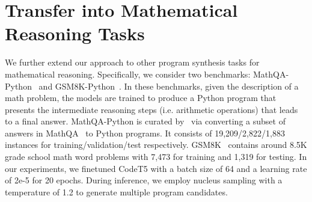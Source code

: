 \documentclass{article}
\begin{document}
\section{Transfer into Mathematical Reasoning Tasks}
We further extend our approach to other program synthesis tasks  for mathematical reasoning. Specifically, we consider two benchmarks: MathQA-Python~\citep{austin2021program} and GSM8K-Python~\citep{palm}. In these benchmarks, given the description of a math problem, the models are trained to produce a Python program that presents the intermediate reasoning steps (i.e. arithmetic operations) that leads to a final answer. MathQA-Python is curated by~\citet{austin2021program} via converting a subset of answers in MathQA~\citep{mathqa} to Python programs. It consists of 19,209/2,822/1,883 instances for training/validation/test respectively. 
GSM8K~\citep{cobbe2021training} contains around 8.5K  grade school math word problems  with 7,473 for training and 1,319 for testing.
In our experiments, we finetuned CodeT5  with a batch size of 64 and a learning rate of 2e-5 for 20 epochs. During inference, we employ nucleus sampling with a temperature of 1.2 to generate multiple program candidates.
\end{document}
